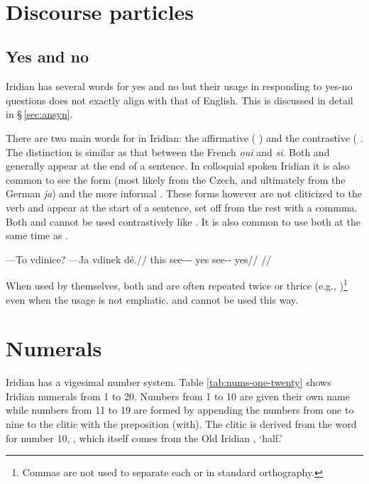   \medskip

  \\
\xe


\section{Discourse particles}

\subsection{Yes and no}
Iridian has several words for yes and no but their usage in responding to yes-no questions does not exactly align with that of English. This is discussed in detail in \S\,\ref{sec:ansyn}.

There are two main words for  in Iridian: the affirmative  ( ) and the contrastive  ( . The distinction is similar as that between the French \emph{oui} and \emph{si}. Both  and  generally appear at the end of a sentence. In colloquial spoken Iridian it is also common to see the form  (most likely from the Czech, and ultimately from the German \emph{ja}) and the more informal . These forms however are not cliticized to the verb and appear at the start of a sentence, set off from the rest with a commma. Both  and  cannot be used contrastively like . It is also common to use both  at the same time as .

\pex
\begingl
\gla ---To vdinice? ---Ja vdinek dé.//
\glb this see-\Pv{}-\Pf{}-\Quot{} yes see-\Pv{}-\Pf{} yes//
\glft {}//
\endgl
\xe

When used by themselves, both  and  are often repeated twice or thrice (e.g., )\footnote{Commas are not used to separate each  or  in standard orthography. } even when the usage is not emphatic.  and  cannot be used this way.

\section{Numerals}\label{sec:numerals}

Iridian has a vigesimal number system. Table \ref{tab:nums-one-twenty} shows
Iridian numerals from 1 to 20. Numbers from 1 to 10 are given their own name
while numbers from 11 to 19 are formed by appending the numbers from one to nine
to the clitic  with the preposition  (with). The clitic
 is derived from the word for number 10, , which itself
comes from the Old Iridian , `half.'

